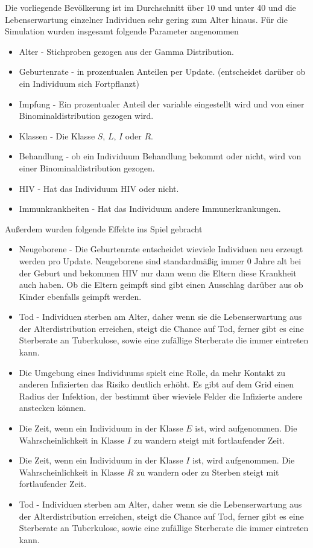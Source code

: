 \documentclass[paper=a4, fontsize=11pt, ngerman, abstract=on]{scrartcl}
\numberwithin{equation}{section} %
\numberwithin{figure}{section} %
\numberwithin{table}{section} %
\begin{document}
Die vorliegende Bevölkerung ist im Durchschnitt über 10 und unter 40 und die Lebenserwartung einzelner Individuen sehr gering zum Alter hinaus. Für die Simulation wurden insgesamt folgende Parameter angenommen

\begin{itemize}
  \item{Alter - Stichproben gezogen aus der Gamma Distribution.}
  \item{Geburtenrate - in prozentualen Anteilen per Update. (entscheidet darüber ob ein Individuum sich Fortpflanzt)}
  \item{Impfung - Ein prozentualer Anteil der variable eingestellt wird und von einer Binominaldistribution gezogen wird.}
  \item{Klassen - Die Klasse $S$, $L$, $I$ oder $R$.}
  \item{Behandlung - ob ein Individuum Behandlung bekommt oder nicht, wird von einer Binominaldistribution gezogen.}
  \item{HIV - Hat das Individuum HIV oder nicht.}
  \item{Immunkrankheiten - Hat das Individuum andere Immunerkrankungen.}
\end{itemize}

Außerdem wurden folgende Effekte ins Spiel gebracht

\begin{itemize}
  \item{Neugeborene - Die Geburtenrate entscheidet wieviele Individuen neu erzeugt werden pro Update. Neugeborene sind standardmäßig immer 0 Jahre alt bei der Geburt und bekommen HIV nur dann wenn die Eltern diese Krankheit auch haben. Ob die Eltern geimpft sind gibt einen Ausschlag darüber aus ob Kinder ebenfalls geimpft werden.}
  \item{Tod - Individuen sterben am Alter, daher wenn sie die Lebenserwartung aus der Alterdistribution erreichen, steigt die Chance auf Tod, ferner gibt es eine Sterberate an Tuberkulose, sowie eine zufällige Sterberate die immer eintreten kann.}
  \item{Die Umgebung eines Individuums spielt eine Rolle, da mehr Kontakt zu anderen Infizierten das Risiko deutlich erhöht. Es gibt auf dem Grid einen Radius der Infektion, der bestimmt über wieviele Felder die Infizierte andere anstecken können.}
  \item{Die Zeit, wenn ein Individuum in der Klasse $E$ ist, wird aufgenommen. Die Wahrscheinlichkeit in Klasse $I$ zu wandern steigt mit fortlaufender Zeit.}
  \item{Die Zeit, wenn ein Individuum in der Klasse $I$ ist, wird aufgenommen. Die Wahrscheinlichkeit in Klasse $R$ zu wandern oder zu Sterben steigt mit fortlaufender Zeit.}
  \item{Tod - Individuen sterben am Alter, daher wenn sie die Lebenserwartung aus der Alterdistribution erreichen, steigt die Chance auf Tod, ferner gibt es eine Sterberate an Tuberkulose, sowie eine zufällige Sterberate die immer eintreten kann.}
\end{itemize}
\end{document}

